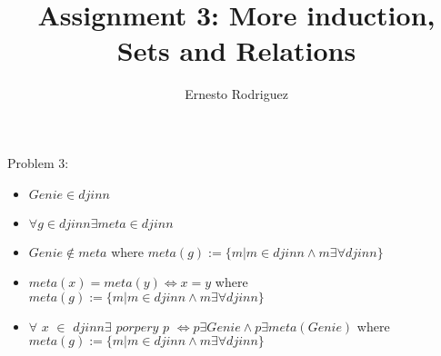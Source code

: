 \documentclass{article}
\title{Assignment 3: More induction, Sets and Relations}
\author{Ernesto Rodriguez}
\begin{document}
\maketitle

Problem 3:

\begin{itemize}

\item{$Genie \in djinn$}
\item{$\forall g \in djinn \exists meta \in djinn$}
\item{$Genie \notin meta$ where $meta(g):=\{m | m \in djinn \wedge m \exists \forall djinn\}$}
\item{$meta(x)=meta(y) \iff x=y$ where $meta(g):=\{m | m \in djinn \wedge m \exists \forall djinn\}$}
\item{$\forall$ $x$ $\in$ $djinn \exists$ $porpery$ $p$ $\iff p \exists Genie \wedge p \exists meta(Genie)$ \newline
where $meta(g):=\{m | m \in djinn \wedge m \exists \forall djinn\}$
}

\end{itemize}
\end{document}
